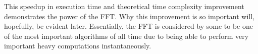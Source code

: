 This speedup in execution time and theoretical time complexity improvement demonstrates the power of the FFT. Why this improvement is so important will, hopefully, be evident later. Essentially, the FFT is considered by some to be one of the most important algorithms of all time due to being able to perform very important heavy computations instantaneously. 





